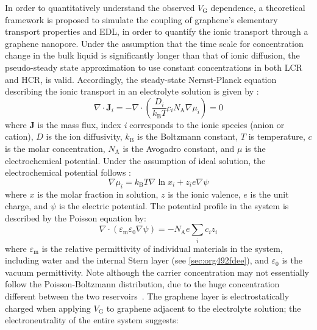 In order to quantitatively understand the observed $V_{\mathrm{G}}$
dependence, a theoretical framework is proposed to simulate the
coupling of graphene's elementary transport properties and EDL, in
order to quantify the ionic transport through a graphene
nanopore. Under the assumption that the time scale for concentration
change in the bulk liquid is significantly longer than
that of ionic diffusion, the pseudo-steady state approximation to use constant concentrations in both LCR and HCR, is valid.
%
Accordingly, the steady-state Nernst-Planck equation describing
the ionic transport in an electrolyte solution is given by
\autocite{MacGillivray_1968_NPE}:
\begin{equation}
  \label{eq:np-pnp}
  \nabla \cdot \symbf{J}_{i} = -\nabla \cdot (\frac{D_{i}}{k_{\mathrm{B}}T} c_{i} N_{\mathrm{A}} \nabla \mu_{i}) = 0
\end{equation}
where $\symbf{J}$ is the mass flux, index \textit{i} corresponds to
the ionic species (anion or cation), $D$ is the ion
diffusivity, $k_{\mathrm{B}}$ is the Boltzmann constant, $T$ is
temperature, $c$ is the molar concentration, $N_{\mathrm{A}}$ is the
Avogadro constant, and $\mu$ is the electrochemical potential. Under
the assumption of ideal solution, the electrochemical potential
follows \autocite{Kilic_2007_steric_effect_ion}:
\begin{equation}
  \label{eq:np-mu}
  \nabla \mu_{i} = k_{\mathrm{B}} T \nabla \ln x_{i} + z_{i} e \nabla \psi
\end{equation}
where $x$ is the molar fraction in solution, $z$ is the ionic valence,
$e$ is the unit charge, and $\psi$ is the electric potential.
%
The potential profile in the system is described by the Poisson
equation by:
\begin{equation}
  \label{eq:np-poisson}
  \nabla \cdot (\varepsilon_{\mathrm{m}} \varepsilon_{0} \nabla \psi)
  =
  - N_{\mathrm{A}} e \sum_{i} c_{i} z_{i}
\end{equation}
where $\varepsilon_{\mathrm{m}}$ is the relative permittivity of
individual materials in the system, including water and the internal
Stern layer (see \autoref{sec:org492fdee}), and $\varepsilon_{0}$ is
the vacuum permittivity.
%
Note although the carrier concentration may not essentially follow the
Poisson-Boltzmann distribution, due to the huge concentration
different between the two reservoirs~\parencite*{Zheng_2011_PNPB}.
%
The graphene layer is electrostatically charged when
applying $V_{\mathrm{G}}$ to graphene adjacent to the electrolyte
solution; the electroneutrality of the entire system suggests:
